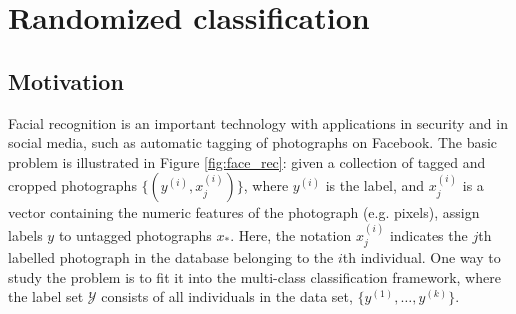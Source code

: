 
\chapter{Randomized classification} %

\label{Chapter2} %


\section{Motivation}

Facial recognition is an important technology with applications in
security and in social media, such as automatic tagging of photographs
on Facebook.  The basic problem is illustrated in Figure
\ref{fig:face_rec}: given a collection of tagged and cropped
photographs $\{(y^{(i)}, x_j^{(i)})\}$, where $y^{(i)}$ is the label,
and $x_j^{(i)}$ is a vector containing the numeric features of the
photograph (e.g. pixels), assign labels $y$ to untagged photographs
$x_*$.  Here, the notation $x_j^{(i)}$ indicates the $j$th labelled
photograph in the database belonging to the $i$th individual. One way
to study the problem is to fit it into the multi-class classification
framework, where the label set $\mathcal{Y}$ consists of all
individuals in the data set, $\{y^{(1)},\hdots, y^{(k)}\}$.

